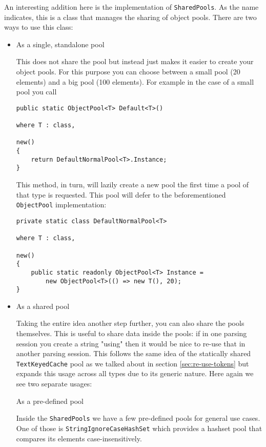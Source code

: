 An interesting addition here is the implementation of \texttt{SharedPools}. As the name indicates, this is a class that manages the sharing of object pools. There are two ways to use this class:

\begin{itemize}
\item As a single, standalone pool

This does not share the pool but instead just makes it easier to create your object pools. For this purpose you can choose between a small pool (20 elements) and a big pool (100 elements). For example in the case of a small pool you call

\begin{lstlisting}
public static ObjectPool<T> Default<T>() 
																where T : class, 
																					new()
{
	return DefaultNormalPool<T>.Instance;
}
\end{lstlisting}

This method, in turn, will lazily create a new pool the first time a pool of that type is requested. This pool will defer to the beforementioned \texttt{ObjectPool} implementation:

\begin{lstlisting}
private static class DefaultNormalPool<T> 
																where T : class, 
																					new()
{
	public static readonly ObjectPool<T> Instance = 
		new ObjectPool<T>(() => new T(), 20);
}
\end{lstlisting}

\item As a shared pool

Taking the entire idea another step further, you can also share the pools themselves. This is useful to share data inside the pools: if in one parsing session you create a string "using" then it would be nice to re-use that in another parsing session. This follows the same idea of the statically shared \texttt{TextKeyedCache} pool as we talked about in section \ref{sec:re-use-tokens} but expands this usage across all types due to its generic nature. Here again we see two separate usages:

\subitem As a pre-defined pool

Inside the \texttt{SharedPools} we have a few pre-defined pools for general use cases. One of those is \texttt{StringIgnoreCaseHashSet} which provides a hashset pool that compares its elements case-insensitively.


\end{itemize}
